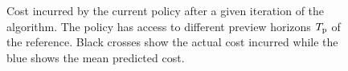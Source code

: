 \begin{figure}
{
\label{fig:cart03}
} 
\caption{Cost incurred by the current policy after a given iteration of the algorithm. The policy has access to different preview horizons $T_{\text{p}}$ of the reference. Black crosses show the actual cost incurred while the blue shows the mean predicted cost. }
\label{fig:cartcosts}
\end{figure}


